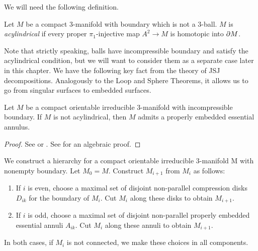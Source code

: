 We will need the following definition.

\begin{defn}

Let $M$ be a compact 3-manifold with boundary which is not a 3-ball. $M$ is
\emph{acylindrical} if every proper $\pi_1$-injective map $A^2 \to M$ is
homotopic into $\partial M$.

\end{defn}

Note that strictly speaking, balls have incompressible boundary and satisfy the
acylindrical condition, but we will want to consider them as a separate case
later in this chapter. We have the following key fact from the theory of JSJ
decompositions.  Analogously to the Loop and Sphere Theorems, it allows us to
go from singular surfaces to embedded surfaces.

\begin{thm}

Let $M$ be a compact orientable irreducible 3-manifold with incompressible
boundary. If $M$ is not acylindrical, then $M$ admits a properly embedded
essential annulus.

\end{thm}

\begin{proof}

See \cite{JacoShalen} or \cite{Johannson}. See \cite{Scottannulus} for an
algebraic proof.

\end{proof}

We construct a hierarchy for a compact orientable irreducible 3-manifold M with
nonempty boundary.  Let $M_0 = M$.  Construct $M_{i+1}$ from $M_i$ as follows:

\begin{enumerate}

\item If $i$ is even, choose a maximal set of disjoint non-parallel compression
disks $D_{ik}$ for the boundary of $M_i$. Cut $M_i$ along these disks to obtain
$M_{i+1}$.

\item If $i$ is odd, choose a maximal set of disjoint non-parallel properly
embedded essential annuli $A_{ik}$. Cut $M_i$ along these annuli to obtain
$M_{i+1}$.

\end{enumerate}

In both cases, if $M_i$ is not connected, we make these choices in all
components.

